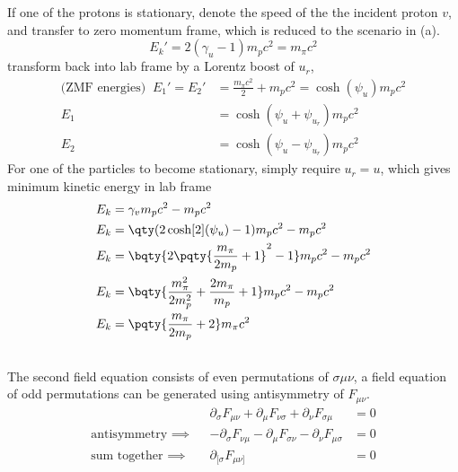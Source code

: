\documentclass[12pt]{article}
\begin{document}
        \subsubsection{} If one of the protons is stationary, denote the speed of the the incident proton \(v\), and transfer to zero momentum frame, which is reduced to the scenario in (a).
        \[
            E_k' = 2 (\gamma_u - 1)m_pc^2 = m_\pi c^2
        \]
        transform back into lab frame by a Lorentz boost of \(u_r\),\begin{align*}
            \text{(ZMF energies) }\ E_1' = E_2' &= \frac{m_\pi c^2}{2} + m_p c^2 = \cosh(\psi_u)m_pc^2\\
            E_1 &= \cosh(\psi_u + \psi_{u_r})m_pc^2\\
            E_2 &= \cosh(\psi_u - \psi_{u_r})m_pc^2
        \end{align*}
        For one of the particles to become stationary, simply require \(u_r = u\), which gives minimum kinetic energy in lab frame
        \begin{align*}
            E_k &= \gamma_v m_pc^2 - m_pc^2\\
            E_k &= \qty(2\cosh[2](\psi_u) - 1) m_pc^2 - m_pc^2\\
            E_k &= \bqty{2\pqty{\frac{m_\pi}{2m_p} + 1}^2 - 1} m_pc^2 - m_pc^2\\
            E_k &= \bqty{\frac{m_\pi^2}{2m_p^2} + \frac{2m_\pi}{m_p} + 1} m_pc^2 - m_pc^2\\
            E_k &= \pqty{\frac{m_\pi}{2m_p} + 2}m_\pi c^2
        \end{align*}
        \subsection{} \subsubsection{} The second field equation consists of even permutations of \(\sigma \mu \nu\), a field equation of odd permutations can be generated using antisymmetry of \(F_{\mu\nu}\). \begin{align*}
            &&\partial_\sigma F_{\mu\nu} + \partial_\mu F_{\nu \sigma} + \partial_\nu F_{\sigma \mu} &= 0\\
            \text{antisymmetry }\implies && -\partial_\sigma F_{\nu\mu} - \partial_\mu F_{\sigma\nu} - \partial_\nu F_{\mu\sigma} &= 0\\
            \text{sum together }\implies && \partial_{[\sigma} F_{\mu\nu]} &=  0
        \end{align*}
\end{document}

